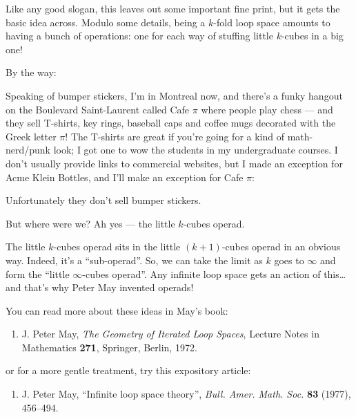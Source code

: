 \documentclass{article}
\def\tightlist{}
\renewcommand{\texttt}[1]{%
  \begingroup
  \ttfamily
  \begingroup\lccode`~=`/\lowercase{\endgroup\def~}{/\discretionary{}{}{}}%
  \begingroup\lccode`~=`[\lowercase{\endgroup\def~}{[\discretionary{}{}{}}%
  \begingroup\lccode`~=`.\lowercase{\endgroup\def~}{.\discretionary{}{}{}}%
  \catcode`/=\active\catcode`[=\active\catcode`.=\active
  \scantokens{#1\noexpand}%
  \endgroup
}
\begin{document}
Like any good slogan, this leaves out some important fine print, but it
gets the basic idea across. Modulo some details, being a \(k\)-fold loop
space amounts to having a bunch of operations: one for each way of
stuffing little \(k\)-cubes in a big one!

By the way:

Speaking of bumper stickers, I'm in Montreal now, and there's a funky
hangout on the Boulevard Saint-Laurent called Cafe \(\pi\) where people
play chess --- and they sell T-shirts, key rings, baseball caps and
coffee mugs decorated with the Greek letter \(\pi\)! The T-shirts are
great if you're going for a kind of math-nerd/punk look; I got one to
wow the students in my undergraduate courses. I don't usually provide
links to commercial websites, but I made an exception for Acme Klein
Bottles, and I'll make an exception for Cafe \(\pi\):


Unfortunately they don't sell bumper stickers.

But where were we? Ah yes --- the little \(k\)-cubes operad.

The little \(k\)-cubes operad sits in the little \((k+1)\)-cubes operad
in an obvious way. Indeed, it's a ``sub-operad''. So, we can take the
limit as \(k\) goes to \(\infty\) and form the ``little \(\infty\)-cubes
operad''. Any infinite loop space gets an action of this\ldots{} and
that's why Peter May invented operads!

You can read more about these ideas in May's book:

\begin{enumerate}
\def\labelenumi{\arabic{enumi})}
\setcounter{enumi}{6}
\tightlist
\item
  J. Peter May, \emph{The Geometry of Iterated Loop Spaces}, Lecture
  Notes in Mathematics \textbf{271}, Springer, Berlin, 1972.
\end{enumerate}

or for a more gentle treatment, try this expository article:

\begin{enumerate}
\def\labelenumi{\arabic{enumi})}
\setcounter{enumi}{7}
\tightlist
\item
  J. Peter May, ``Infinite loop space theory'', \emph{Bull. Amer. Math.
  Soc.} \textbf{83} (1977), 456--494.
\end{enumerate}
\end{document}

